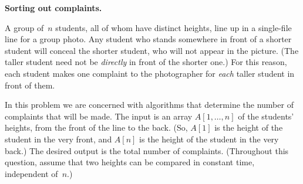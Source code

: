 \documentclass[11pt,addpoints]{exam}
\begin{document}
\begin{questions}
\begin{parts}
    \begin{solution}
    \end{solution}
  \end{parts}
  
  \question \textbf{Sorting out complaints.}
    
  A group of~$n$ students, all of whom have distinct heights, line up in a single-file line for a group photo.
  Any student who stands somewhere in front of a shorter student will conceal the shorter student, who will not appear in the picture.
  (The taller student need not be \emph{directly} in front of the shorter one.)
  For this reason, each student makes one complaint to the photographer for \emph{each} taller student in front of them.

  In this problem we are concerned with algorithms that determine the number of complaints that will be made.
  The input is an array $A[1,\ldots,n]$ of the students' heights, from the front of the line to the back.
  (So, $A[1]$ is the height of the student in the very front, and $A[n]$ is the height of the student in the very back.)
  The desired output is the total number of complaints.
  (Throughout this question, assume that two heights can be compared in constant time, independent of~$n$.)

\end{questions}
\end{document}
